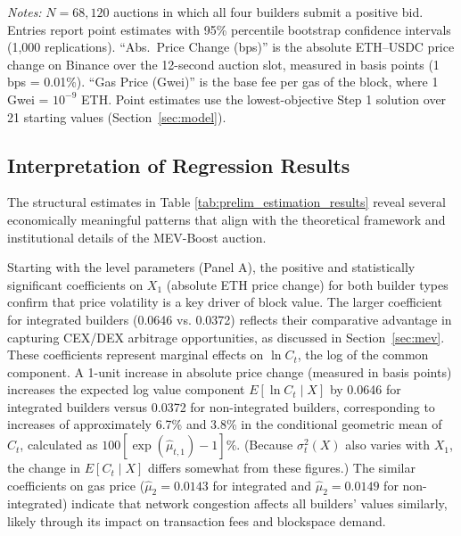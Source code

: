 \documentclass[12pt,reqno]{amsart}
\begin{document}
\begin{table}[t]
\vspace{6pt}
\parbox{\linewidth}{\footnotesize\emph{Notes:} $N = 68{,}120$ auctions in which all four builders submit a positive bid. Entries report point estimates with 95\% percentile bootstrap confidence intervals (1,000 replications).
``Abs.\ Price Change (bps)'' is the absolute ETH--USDC price change on Binance over the 12-second auction slot, measured in basis points (1 bps = 0.01\%).
``Gas Price (Gwei)'' is the base fee per gas of the block, where 1 Gwei = $10^{-9}$ ETH.
Point estimates use the lowest-objective Step 1 solution over 21 starting values (Section~\ref{sec:model}).}

\end{table}

\subsection{Interpretation of Regression Results}

The structural estimates in Table \ref{tab:prelim_estimation_results} reveal several economically meaningful patterns that align with the theoretical framework and institutional details of the MEV-Boost auction. 

Starting with the level parameters (Panel A), the positive and statistically significant coefficients on $X_1$ (absolute ETH price change) for both builder types confirm that price volatility is a key driver of block value. The larger coefficient for integrated builders (0.0646 vs. 0.0372) reflects their comparative advantage in capturing CEX/DEX arbitrage opportunities, as discussed in Section~\ref{sec:mev}. These coefficients represent marginal effects on $\ln C_t$, the log of the common component. A 1-unit increase in absolute price change (measured in basis points) increases the expected log value component $E[\ln C_t \mid X]$ by 0.0646 for integrated builders versus 0.0372 for non-integrated builders, corresponding to increases of approximately 6.7\% and 3.8\% in the conditional geometric mean of $C_t$, calculated as $100[\exp(\hat\mu_{t,1})-1]\%$. (Because $\sigma_t^2(X)$ also varies with $X_1$, the change in $E[C_t \mid X]$ differs somewhat from these figures.) The similar coefficients on gas price ($\hat{\mu}_2 = 0.0143$ for integrated and $\hat{\mu}_2 = 0.0149$ for non-integrated) indicate that network congestion affects all builders' values similarly, likely through its impact on transaction fees and blockspace demand.
\end{document}
